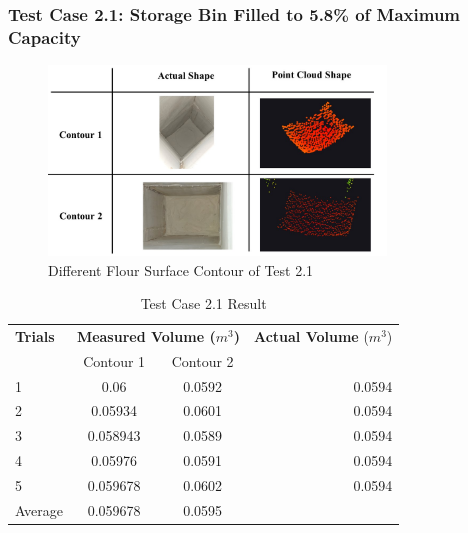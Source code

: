 \subsubsection*{Test Case 2.1: Storage Bin Filled to 5.8\% of Maximum Capacity}

\begin{figure}[H]
	\centering
	\includegraphics[width=0.8\textwidth]{Figures/test_2-1_contours}
	\caption{Different Flour Surface Contour of Test 2.1}
	\label{ch4:fig:test_2-1_contours}
\end{figure}

\begin{table}[H]
	\centering
	\caption{Test Case 2.1 Result}
	\label{table:test_case_2-1_results}
	\begin{tabular}{l c c r}
		\toprule
		\textbf{Trials} & \multicolumn{2}{c}{\textbf{Measured Volume ($m^{3}$)}} & \textbf{Actual Volume} ($m^{3}$)          \\
		{}              & Contour 1                                              & Contour 2                        & {}     \\ \midrule
		1               & 0.06                                                   & 0.0592                           & 0.0594 \\
		2               & 0.05934                                                & 0.0601                           & 0.0594 \\
		3               & 0.058943                                               & 0.0589                           & 0.0594 \\
		4               & 0.05976                                                & 0.0591                           & 0.0594 \\
		5               & 0.059678                                               & 0.0602                           & 0.0594 \\ \midrule
		Average         & 0.059678                                               & 0.0595                           & {}     \\ \bottomrule
	\end{tabular}
\end{table}

